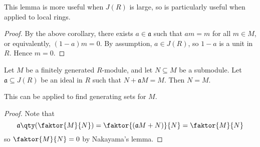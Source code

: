 This lemma is more useful when \( J(R) \) is large, so is particularly useful when applied to local rings.
\begin{proof}
    By the above corollary, there exists \( a \in \mathfrak a \) such that \( am = m \) for all \( m \in M \), or equivalently, \( (1 - a)m = 0 \).
    By assumption, \( a \in J(R) \), so \( 1 - a \) is a unit in \( R \).
    Hence \( m = 0 \).
\end{proof}
\begin{corollary}
    Let \( M \) be a finitely generated \( R \)-module, and let \( N \subseteq M \) be a submodule.
    Let \( \mathfrak a \subseteq J(R) \) be an ideal in \( R \) such that \( N + \mathfrak a M = M \).
    Then \( N = M \).
\end{corollary}
This can be applied to find generating sets for \( M \).
\begin{proof}
    Note that
    \[ \mathfrak a \qty(\faktor{M}{N}) = \faktor{(\mathfrak a M + N)}{N} = \faktor{M}{N} \]
    so \( \faktor{M}{N} = 0 \) by Nakayama's lemma.
\end{proof}

